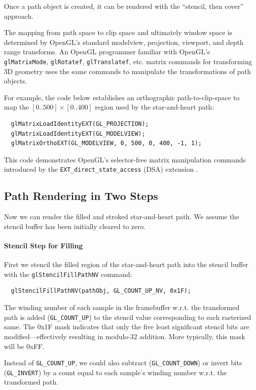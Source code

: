 Once a path object is created, it can be rendered with the ``stencil,
then cover'' approach.

The mapping from path space to clip space and ultimately window space
is determined by OpenGL's standard modelview, projection, viewport,
and depth range transforms.  An OpenGL programmer familiar with OpenGL's
{\tt glMatrixMode}, {\tt glRotatef}, {\tt glTranslatef}, etc. matrix commands
for transforming 3D geometry uses the same commands to manipulate the
transformations of path objects.

For example, the code below establishes an orthographic path-to-clip-space
to map the $[0..500]\times[0..400]$ region used by the star-and-heart path:
\begin{lstlisting}
  glMatrixLoadIdentityEXT(GL_PROJECTION);
  glMatrixLoadIdentityEXT(GL_MODELVIEW);
  glMatrixOrthoEXT(GL_MODELVIEW, 0, 500, 0, 400, -1, 1);
\end{lstlisting}
This code demonstrates OpenGL's selector-free matrix manipulation
commands introduced by the {\tt EXT\_direct\_state\_access} (DSA) extension \cite{DSA}.

\subsection{Path Rendering in Two Steps}

Now we can render the filled and stroked star-and-heart path.  We assume
the stencil buffer has been initially cleared to zero.

\paragraph{Stencil Step for Filling}

First we stencil the filled region of the star-and-heart path into the
stencil buffer with the {\tt glStencilFillPathNV} command:
\begin{lstlisting}
  glStencilFillPathNV(pathObj, GL_COUNT_UP_NV, 0x1F);
\end{lstlisting}
The winding number of each sample in the framebuffer w.r.t. the
transformed path is added ({\tt GL\_COUNT\_UP}) to the stencil value corresponding
to each rasterized same.   The 0x1F mask indicates that only the five
least significant stencil bits are modified---effectively resulting in
modulo-32 addition.  More typically, this mask will be 0xFF.

Instead of {\tt GL\_COUNT\_UP}, we could also subtract ({\tt GL\_COUNT\_DOWN})
or invert bits ({\tt GL\_INVERT}) by a count equal to each sample's winding
number w.r.t. the transformed path.

